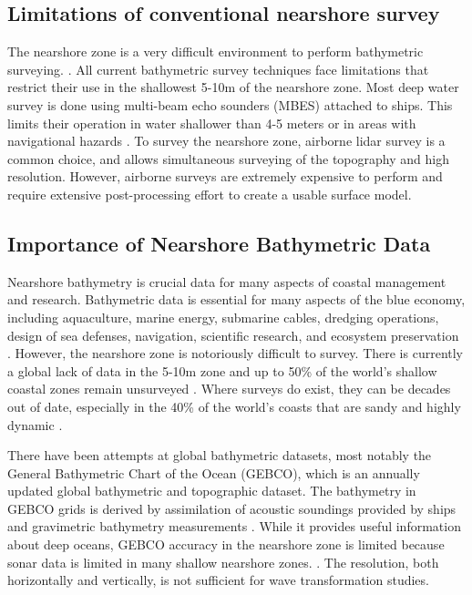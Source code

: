 \subsection{Limitations of conventional nearshore survey}

The nearshore zone is a very difficult environment to perform bathymetric surveying. \parencite{Parrish2019}. All current bathymetric survey techniques face limitations that restrict their use in the shallowest 5-10m of the nearshore zone. Most deep water survey is done using multi-beam echo sounders (MBES) attached to ships. This limits their operation in water shallower than 4-5 meters or in areas with navigational hazards \parencite{Cesbron2021,Monteys2015}. To survey the nearshore zone, airborne lidar survey is a common choice, and allows simultaneous surveying of the topography and high resolution. However, airborne surveys are extremely expensive to perform and require extensive post-processing effort to create a usable surface model.


\subsection{Importance of Nearshore Bathymetric Data}

Nearshore bathymetry is crucial data for many aspects of coastal management and research. Bathymetric data is essential for many aspects of the blue economy, including aquaculture, marine energy, submarine cables, dredging operations, design of sea defenses, navigation, scientific research, and ecosystem preservation \parencite{Cesbron2021,Ashphaq2021}. However, the nearshore zone is notoriously difficult to survey. There is currently a global lack of data in the 5-10m zone \parencite{Albright2021} and up to 50\% of the world's shallow coastal zones remain unsurveyed \parencite{IHO/OHI2022}. Where surveys do exist, they can be decades out of date, especially in the 40\% of the world's coasts that are sandy and highly dynamic \parencite{Almar2021e}.

There have been attempts at global bathymetric datasets, most notably the General Bathymetric Chart of the Ocean (GEBCO), which is an annually updated global bathymetric and topographic dataset. The bathymetry in GEBCO grids is derived by assimilation of acoustic soundings provided by ships and gravimetric bathymetry measurements \parencite{Cesbron2021}. While it provides useful information about deep oceans, GEBCO accuracy in the nearshore zone is limited because sonar data is limited in many shallow nearshore zones. \parencite{Monteys2015}. The resolution, both horizontally and vertically, is not sufficient for wave transformation studies.

